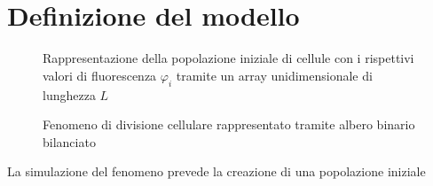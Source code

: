 \section{Definizione del modello}
\begin{figure}[h]
    \centering
    \caption{Rappresentazione della popolazione iniziale di cellule con i rispettivi
        valori di fluorescenza $\varphi_{i}$ tramite un array unidimensionale
        di lunghezza $L$}
    \label{fig:population-array}
\end{figure}
\begin{figure}[h]
\centering
{}
\caption{Fenomeno di divisione cellulare rappresentato tramite albero
    binario bilanciato}
\label{fig:proliferation-tree}
\end{figure}
La simulazione del fenomeno prevede la creazione di una popolazione iniziale
